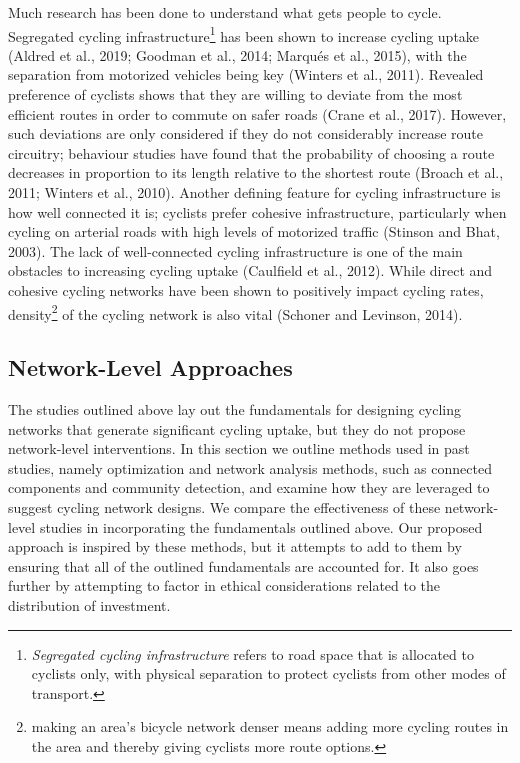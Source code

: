 \documentclass[
]{article}
\begin{document}
Much research has been done to understand what gets people to cycle.
Segregated cycling infrastructure\footnote{\emph{Segregated cycling infrastructure}
  refers to road space that is allocated to cyclists only, with physical
  separation to protect cyclists from other modes of transport.} has been
shown to increase cycling uptake (Aldred et al., 2019; Goodman et al., 2014; Marqués et al., 2015), with the separation from motorized
vehicles being key (Winters et al., 2011). Revealed preference of
cyclists shows that they are willing to deviate from the most efficient
routes in order to commute on safer roads (Crane et al., 2017).
However, such deviations are only considered if they do not considerably
increase route circuitry; behaviour studies have found that the
probability of choosing a route decreases in proportion to its length
relative to the shortest route (Broach et al., 2011; Winters et al., 2010).
Another defining feature for cycling infrastructure is how well
connected it is; cyclists prefer cohesive infrastructure, particularly
when cycling on arterial roads with high levels of motorized traffic
(Stinson and Bhat, 2003). The lack of well-connected cycling
infrastructure is one of the main obstacles to increasing cycling uptake
(Caulfield et al., 2012). While direct and cohesive cycling networks
have been shown to positively impact cycling rates, density\footnote{making an
  area's bicycle network denser means adding more cycling routes in the
  area and thereby giving cyclists more route options.} of the cycling
network is also vital (Schoner and Levinson, 2014).

\hypertarget{network-level-approaches}{%
\subsection{Network-Level Approaches}\label{network-level-approaches}}

The studies outlined above lay out the fundamentals for designing
cycling networks that generate significant cycling uptake, but they do
not propose network-level interventions. In this section we outline
methods used in past studies, namely optimization and network
analysis methods, such as connected components and community
detection, and examine how they are leveraged to suggest cycling network
designs. We compare the effectiveness of these network-level studies in
incorporating the fundamentals outlined above.
Our proposed approach is inspired by these methods, but it attempts to add to them
by ensuring that all of the outlined fundamentals are accounted for. It
also goes further by attempting to factor in ethical considerations
related to the distribution of investment.
\end{document}

